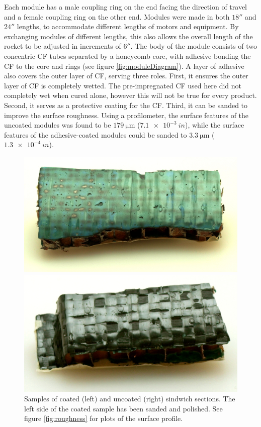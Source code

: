 \documentclass{aiaa-tc}%
\begin{document}
Each module has a male coupling ring on the end facing the direction of travel and a female coupling ring on the other end. 
Modules were made in both $18''$ and $24''$ lengths, to accommodate different lengths of motors and equipment. 
By exchanging modules of different lengths, this also allows the overall length of the rocket to be adjusted in increments of $6''$.
The body of the module consists of two concentric CF tubes separated by a honeycomb core, with adhesive bonding the CF to the core and rings (see figure \ref{fig:moduleDiagram}). 
A layer of adhesive also covers the outer layer of CF, serving three roles. First, it ensures the outer layer of CF is completely wetted. 
The pre-impregnated CF used here did not completely wet when cured alone, however this will not be true for every product.
Second, it serves as a protective coating for the CF. 
Third, it can be sanded to improve the surface roughness.
Using a profilometer, the surface features of the uncoated modules was found to be $\SI{179}{\micro\meter}$ ($\SI{7.1e-3}{in}$), while the surface features of the adhesive-coated modules could be sanded to $\SI{3.3}{\micro\meter}$ ($\SI{1.3e-4}{in}$).

\begin{figure}
	\centering
	\parbox{0.45\linewidth}
	{
		\includegraphics[width=\linewidth]{../img/coated.JPG}	
	}
	\parbox{0.45\linewidth}
	{
		\includegraphics[width=\linewidth]{../img/uncoated.JPG}	
	}
	\caption{Samples of coated (left) and uncoated (right) sindwich sections. The left side of the coated sample has been sanded and polished. See figure \ref{fig:roughness} for plots of the surface profile.}
	\label{fig:coating}
\end{figure}
\end{document}
